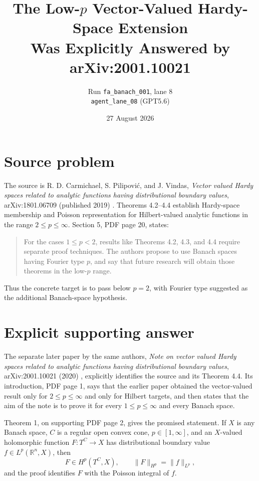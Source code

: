 \documentclass[11pt]{article}
\title{The Low-$p$ Vector-Valued Hardy-Space Extension\\
Was Explicitly Answered by arXiv:2001.10021}
\author{Run \texttt{fa\_banach\_001}, lane 8\\
\texttt{agent\_lane\_08} (GPT5.6)}
\date{27 August 2026}
\begin{document}
\maketitle

\begin{center}
\end{center}

\section{Source problem}

The source is R. D. Carmichael, S. Pilipovi\'{c}, and J. Vindas,
\emph{Vector valued Hardy spaces related to analytic functions having
distributional boundary values}, arXiv:1801.06709 (published 2019)
\cite{source}.  Theorems 4.2--4.4 establish Hardy-space membership and
Poisson representation for Hilbert-valued analytic functions in the range
$2\leq p\leq\infty$.  Section 5, PDF page 20, states:

\begin{quote}
For the cases $1\leq p<2$, results like Theorems 4.2, 4.3, and 4.4 require
separate proof techniques.  The authors propose to use Banach spaces having
Fourier type $p$, and say that future research will obtain those theorems in
the low-$p$ range.
\end{quote}

Thus the concrete target is to pass below $p=2$, with Fourier type suggested
as the additional Banach-space hypothesis.

\section{Explicit supporting answer}

The separate later paper by the same authors,
\emph{Note on vector valued Hardy spaces related to analytic functions having
distributional boundary values}, arXiv:2001.10021 (2020) \cite{support},
explicitly identifies the source and its Theorem 4.4.  Its introduction,
PDF page 1, says that the earlier paper obtained the vector-valued result only
for $2\leq p\leq\infty$ and only for Hilbert targets, and then states that the
aim of the note is to prove it for every $1\leq p\leq\infty$ and every Banach
space.

Theorem 1, on supporting PDF page 2, gives the promised statement.  If $X$ is
any Banach space, $C$ is a regular open convex cone, $p\in[1,\infty]$, and an
$X$-valued holomorphic function $F:T^C\to X$ has distributional boundary
value $f\in L^p(\mathbb R^n,X)$, then
\[
 F\in H^p(T^C,X),\qquad
 \|F\|_{H^p}=\|f\|_{L^p},
\]
and the proof identifies $F$ with the Poisson integral of $f$.
\end{document}
